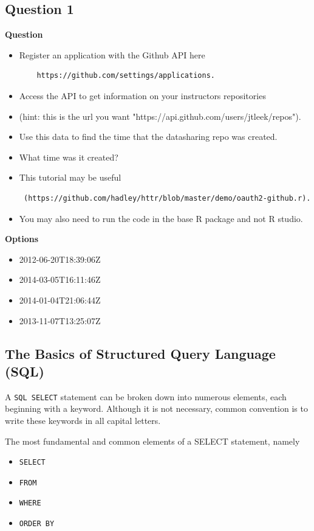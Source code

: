 \subsection*{Question 1}
\textbf{Question}
\begin{itemize}
	\item Register an application with the Github API here 
	\begin{verbatim}
	https://github.com/settings/applications. 
	\end{verbatim}
	\item Access the API to get information on your instructors repositories 
	\item (hint: this is the url you want "https://api.github.com/users/jtleek/repos"). \item Use this data to find the time that the datasharing repo was created. \item What time was it created?
	\item This tutorial may be useful
	\begin{verbatim} (https://github.com/hadley/httr/blob/master/demo/oauth2-github.r).
	\end{verbatim}
	\item You may also need to run the code in the base R package and not R studio.
\end{itemize}

\noindent \textbf{Options} \\
\begin{itemize}
\item[(i)] 2012-06-20T18:39:06Z
\item[(ii)] 2014-03-05T16:11:46Z
\item[(iii)] 2014-01-04T21:06:44Z
\item[(iv)] 2013-11-07T13:25:07Z
\end{itemize}
\newpage
\subsection*{The Basics of Structured Query Language (SQL)}

A \texttt{SQL SELECT} statement can be broken down into numerous elements, each beginning with a keyword. Although it is not necessary, common convention is to write these keywords in all capital letters. 

The most fundamental and common elements of a SELECT statement, namely

\begin{itemize}
\item \texttt{SELECT}
\item \texttt{FROM}
\item \texttt{WHERE}
\item \texttt{ORDER BY}
\end{itemize}
